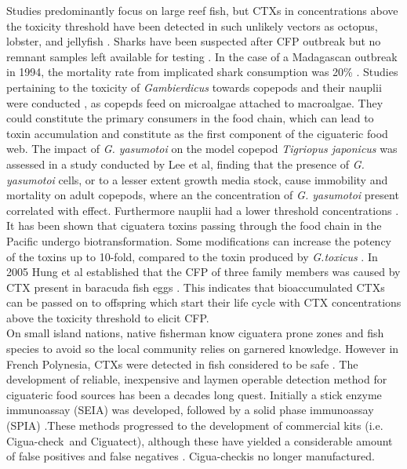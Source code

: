 \documentclass[12pt]{article}
\begin{document}
Studies predominantly focus on large reef fish, but CTXs in concentrations above the toxicity  threshold have been detected in such unlikely vectors as octopus, lobster, and jellyfish \cite{mak2013pacific,zlotnick1995ciguatera}.
Sharks have been suspected after CFP outbreak but no remnant samples left available for testing \cite{boisier1995fatal,lehane2000ciguatera,habermehl1994severe}. In the case of a Madagascan outbreak in 1994, the mortality rate from implicated shark consumption was 20\% \cite{habermehl1994severe}. 
Studies pertaining to the toxicity of \emph{Gambierdicus} towards copepods and their nauplii were conducted \cite{lee2014toxicity}, as copepds feed on microalgae attached to macroalgae. They could constitute the primary consumers in the food chain, which can lead to toxin accumulation \cite{raisuddin2007copepod} and constitute as the first component of the ciguateric food web. The impact of \emph{G. yasumotoi} on the model copepod \emph{Tigriopus japonicus} was assessed in a study conducted by Lee et al, finding that the presence of \emph{G. yasumotoi} cells, or to a lesser extent growth media stock, cause immobility and mortality on adult copepods, where an the concentration of \emph{G. yasumotoi} present correlated with effect. Furthermore nauplii had a lower threshold concentrations \cite{lee2014toxicity}. \\
It has been shown that ciguatera toxins passing through the food chain in the Pacific undergo biotransformation. %
Some modifications can increase the potency of the toxins up to 10-fold, compared to the toxin produced by \textit{G.toxicus} \cite{lewis2006ciguatera}.
In 2005 Hung et al established that the CFP of three family members was caused by CTX present in baracuda fish eggs \cite{hung2005persistent}. This indicates that bioaccumulated CTXs can be passed on to offspring which start their life cycle with CTX concentrations above the toxicity threshold to elicit CFP.  \\ %
On small island nations, native fisherman know ciguatera prone zones and fish species to avoid so the local community relies on garnered knowledge. However in French Polynesia, CTXs were detected in fish considered to be safe \cite{darius2007ciguatera}.
The development of reliable, inexpensive and laymen operable detection method for ciguateric food sources has been a decades long quest. Initially a stick enzyme immunoassay (SEIA) \cite{hokama1985rapid} was developed, followed by a solid phase immunoassay (SPIA) \cite{hokama1990simplified}.These methods progressed to the development of commercial kits (i.e. Cigua-check\textregistered \ and Ciguatect\textregistered), although these have yielded a considerable amount of false positives and false negatives \cite{wong2005study}. Cigua-check\textregistered is no longer manufactured.%
\end{document}
